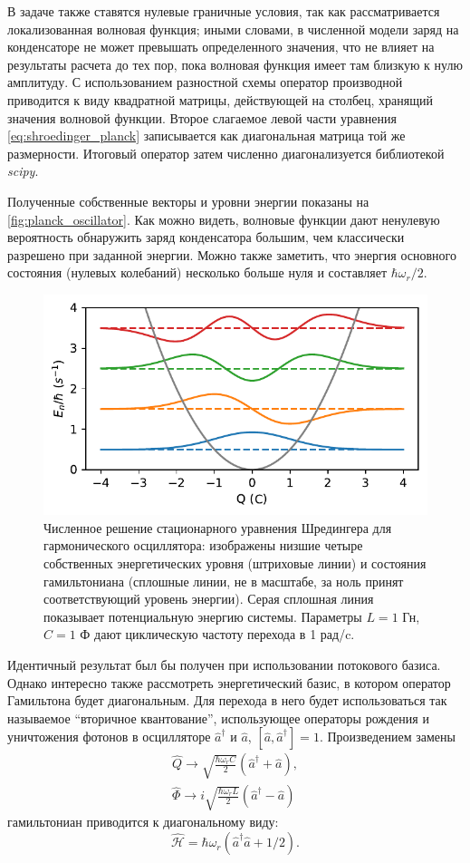 \documentclass[14pt, a4paper]{extreport}
\numberwithin{equation}{section}
\begin{document}
В задаче также ставятся нулевые граничные условия, так как рассматривается локализованная волновая функция; иными словами, в численной модели заряд на конденсаторе не может превышать определенного значения, что не влияет на результаты расчета до тех пор, пока волновая функция имеет там близкую к нулю амплитуду. С использованием разностной схемы оператор производной приводится к виду квадратной матрицы, действующей на столбец, хранящий значения волновой функции. Второе слагаемое левой части уравнения \eqref{eq:shroedinger_planck} записывается как диагональная матрица той же размерности. Итоговый оператор затем численно диагонализуется библиотекой \textit{scipy}.

Полученные собственные векторы и уровни энергии показаны на \autoref{fig:planck_oscillator}. Как можно видеть, волновые функции дают ненулевую вероятность обнаружить заряд конденсатора большим, чем классически разрешено при заданной энергии. Можно также заметить, что энергия основного состояния (нулевых колебаний) несколько больше нуля и составляет $\hbar \omega_r/2$.


\begin{figure}
	\centering
	\includegraphics[width=.6\linewidth]{planck_oscillator}
	\caption{Численное решение стационарного уравнения Шредингера для гармонического осциллятора: изображены низшие четыре собственных энергетических уровня (штриховые линии) и состояния гамильтониана (сплошные линии, не в масштабе, за ноль принят соответствующий уровень энергии). Серая сплошная линия показывает потенциальную энергию системы. Параметры $L = 1$ Гн, $ C = 1$ Ф дают циклическую частоту перехода в 1 рад/c.}
	\label{fig:planck_oscillator}
\end{figure}


Идентичный результат был бы получен при использовании потокового базиса. Однако интересно также рассмотреть энергетический базис, в котором оператор Гамильтона будет диагональным. Для перехода в него будет использоваться так называемое ``вторичное квантование'', использующее операторы рождения и уничтожения фотонов в осцилляторе $\hat a^\dag$ и $\hat a$, $[\hat a, \hat a^\dag] = 1$. Произведением замены 
\begin{align}
	\hat Q \rightarrow \sqrt{\frac{\hbar \omega_r C}{2}}(\hat a^\dag + \hat a),\\
	\hat \Phi \rightarrow i\sqrt{\frac{\hbar \omega_r L}{2}}(\hat a^\dag - \hat a)
\end{align}
гамильтониан приводится к диагональному виду:
\begin{equation}
	\hat{\mathcal H} =  \hbar \omega_r (\hat a^\dag \hat a + 1/2).
\end{equation}
\end{document}

